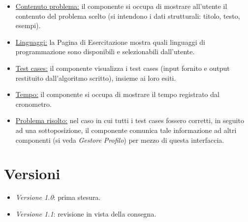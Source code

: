 \documentclass[11pt, a4paper]{article}
\theoremstyle{definition} %
\begin{document}
\begin{description}
\begin{itemize}
        \item \underline{Contenuto problema:} il componente si occupa di mostrare
        all'utente il contenuto del problema scelto (si intendono i dati strutturali:
        titolo, testo, esempi).

        \item \underline{Linguaggi:} la Pagina di Esercitazione mostra quali
        linguaggi di programmazione sono disponibili e selezionabili dall'utente.

        \item \underline{Test cases:} il componente visualizza i test cases
        (input fornito e output restituito dall'algoritmo scritto), insieme ai
        loro esiti.

        \item \underline{Tempo:} il componente si occupa di mostrare il tempo
        registrato dal cronometro.

        \item \underline{Problema risolto:} nel caso in cui tutti i test cases
        fossero corretti, in seguito ad una sottoposizione, il componente comunica
        tale informazione ad altri componenti (si veda \textit{Gestore Profilo}) per
        mezzo di questa interfaccia.
    \end{itemize}
\end{description}

\newpage
\section*{Versioni}
\begin{itemize}
    \item \textit{Versione 1.0}: prima stesura.
    \item \textit{Versione 1.1}: revisione in vista della consegna.
\end{itemize}
\end{document}

